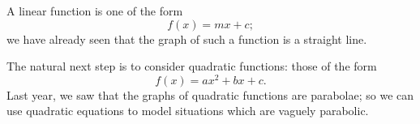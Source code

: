 




A linear function is one of the form
\begin{displaymath}
  f(x) = mx + c;
\end{displaymath}
we have already seen that the graph of such a function is a straight line.

The natural next step is to consider quadratic functions: those of the form
\begin{displaymath}
  f(x) = ax^2 + bx + c.
\end{displaymath}
Last year, we saw that the graphs of quadratic functions are parabolae; so we can use quadratic equations to model situations
which are vaguely parabolic.

